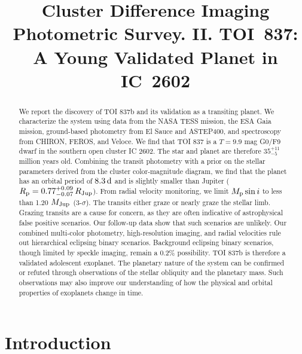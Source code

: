 \documentclass[12pt,twocolumn,tighten]{aastex63}
\begin{document}

\title{
  Cluster Difference Imaging Photometric Survey. II.
  TOI~837: A Young Validated Planet in IC~2602
}



\begin{abstract}
  We report the discovery of TOI 837b and its validation as a
  transiting planet.  We characterize the system using data from the
  NASA TESS mission, the ESA Gaia mission, ground-based photometry
  from El Sauce and ASTEP400, and spectroscopy from CHIRON, FEROS, and
  Veloce.  We find that TOI 837 is a $T=9.9$ mag G0/F9 dwarf in the
  southern open cluster IC 2602.  The star and planet are therefore
  $35^{+11}_{-5}$ million years old.  Combining the transit photometry
  with a prior on the stellar parameters derived from the cluster
  color-magnitude diagram, we find that the planet has an orbital
  period of $8.3\,{\rm d}$ and is slightly smaller than Jupiter
  ($R_{\rm p} = 0.77^{+0.09}_{-0.07} \,R_{\rm Jup}$).  From radial
  velocity monitoring, we limit $M_{\rm p}\sin i$ to less than 1.20
  $M_{\rm Jup}$ (3-$\sigma$).  The transits either graze or nearly
  graze the stellar limb.  Grazing transits are a cause for concern,
  as they are often indicative of astrophysical false positive
  scenarios.  Our follow-up data show that such scenarios are
  unlikely.  Our combined multi-color photometry, high-resolution
  imaging, and radial velocities rule out hierarchical eclipsing
  binary scenarios.  Background eclipsing binary scenarios, though
  limited by speckle imaging, remain a 0.2\% possibility.  TOI 837b is
  therefore a validated adolescent exoplanet.  The planetary nature of
  the system can be confirmed or refuted through observations of the
  stellar obliquity and the planetary mass.  Such observations may
  also improve our understanding of how the physical and orbital
  properties of exoplanets change in time.
\end{abstract}




\section{Introduction}
\end{document}
